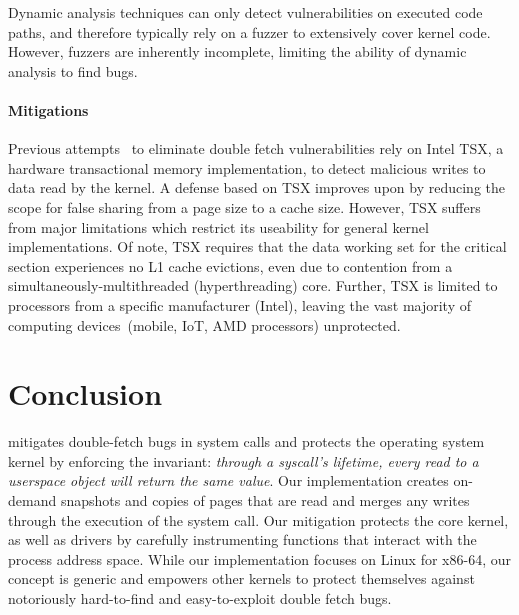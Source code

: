 Dynamic analysis techniques can only detect vulnerabilities on executed code
paths, and therefore typically rely on a fuzzer to extensively cover kernel code.
However, fuzzers are inherently incomplete, limiting the ability of dynamic
analysis to find bugs.


\paragraph{Mitigations}
%
Previous attempts~\cite{schwartzDECAF,dftinker} to eliminate double fetch
vulnerabilities rely on Intel TSX, a hardware transactional
memory implementation, to detect malicious writes to data read by the
kernel.
A defense based on TSX improves upon \midas by reducing the scope for
false sharing from a page size to a cache size.
However, TSX suffers from major limitations which restrict its useability
for general kernel implementations.
Of note, TSX requires that the data working set for the critical section
experiences no L1 cache evictions, even due to contention from a
simultaneously-multithreaded (hyperthreading) core.
Further, TSX is limited to processors from a specific manufacturer (Intel),
leaving the vast majority
of computing devices~(mobile, IoT, AMD processors) unprotected.

\section{Conclusion}

\midas mitigates double-fetch bugs in system calls and protects the operating
system kernel by enforcing the invariant:  \emph{through a syscall's
lifetime, every read to a userspace object will return the same value}.
Our \midas implementation creates on-demand snapshots and copies of pages that
are read and merges any writes through the execution of the system call.
%
Our mitigation protects the core kernel, as well as drivers by carefully
instrumenting functions that interact with the process address space. While our
implementation focuses on Linux for x86-64, our concept is generic and empowers
other kernels to protect themselves against notoriously hard-to-find and
easy-to-exploit double fetch bugs.

